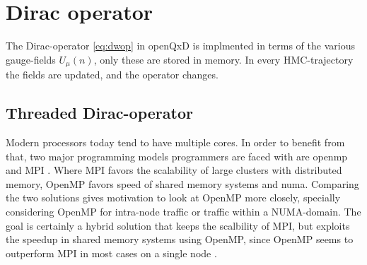 \documentclass{article}
\theoremstyle{plain} %
\theoremstyle{convention} %
\theoremstyle{remark} %
\numberwithin{equation}{section}
\begin{document}
\section{Dirac operator}

The Dirac-operator \eqref{eq:dwop} in openQxD is implmented in terms of the various gauge-fields $U_{\mu}(n)$, only these are stored in memory. In every HMC-trajectory the fields are updated, and the operator changes.

\subsection{Threaded Dirac-operator}

\label{sec:threads}

Modern processors today tend to have multiple cores. In order to benefit from that, two major programming models programmers are faced with are \acrshort{openmp} \cite{openmp45} and \acrshort{MPI} \cite{mpi}. Where MPI favors the scalability of large clusters with distributed memory, OpenMP favors speed of shared memory systems and \acrfull{numa}. Comparing the two solutions gives motivation to look at OpenMP more closely, specially considering OpenMP for intra-node traffic or traffic within a NUMA-domain. The goal is certainly a hybrid solution that keeps the scalbility of MPI, but exploits the speedup in shared memory systems using OpenMP, since OpenMP seems to outperform MPI in most cases on a single node \cite{chan2011}.
\end{document}

